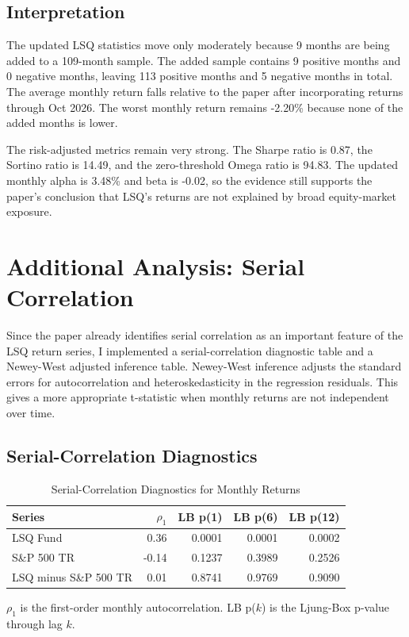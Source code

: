 \documentclass[11pt]{article}
\begin{document}
\subsection*{Interpretation}
The updated LSQ statistics move only moderately because 9 months are being added to a 109-month sample.
The added sample contains 9 positive months and 0 negative months, leaving 113 positive months and 5 negative months in total.
The average monthly return falls relative to the paper after incorporating returns through Oct 2026.
The worst monthly return remains -2.20\% because none of the added months is lower.

The risk-adjusted metrics remain very strong.
The Sharpe ratio is 0.87, the Sortino ratio is 14.49, and the zero-threshold Omega ratio is 94.83.
The updated monthly alpha is 3.48\% and beta is -0.02, so the evidence still supports the paper's conclusion that LSQ's returns are not explained by broad equity-market exposure.

\clearpage
\section*{Additional Analysis: Serial Correlation}
Since the paper already identifies serial correlation as an important feature of the LSQ return series, I implemented a serial-correlation diagnostic table and a Newey-West adjusted inference table.
Newey-West inference adjusts the standard errors for autocorrelation and heteroskedasticity in the regression residuals.
This gives a more appropriate t-statistic when monthly returns are not independent over time.

\subsection*{Serial-Correlation Diagnostics}
\begin{table}[H]
\centering
\caption{Serial-Correlation Diagnostics for Monthly Returns}
\label{tab:serial-correlation}
\small
\begin{tabular}{lrrrr}
\toprule
Series & $\rho_1$ & LB p(1) & LB p(6) & LB p(12) \\
\midrule
LSQ Fund & 0.36 & 0.0001 & 0.0001 & 0.0002 \\
S\&P 500 TR & -0.14 & 0.1237 & 0.3989 & 0.2526 \\
LSQ minus S\&P 500 TR & 0.01 & 0.8741 & 0.9769 & 0.9090 \\
\bottomrule
\end{tabular}

\vspace{0.15cm}
\begin{minipage}{0.86\linewidth}
\footnotesize
$\rho_1$ is the first-order monthly autocorrelation.
LB p($k$) is the Ljung-Box p-value through lag $k$.
\end{minipage}
\end{table}
\end{document}
